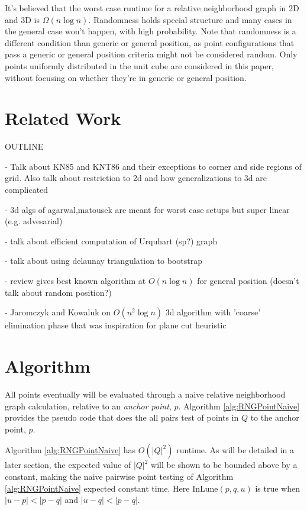 \documentclass[a4paper,fleqn]{cas-dc}
\begin{document}
It's believed that the worst case runtime for a relative neighborhood graph in 2D and 3D is
$\Omega(n \log n)$.
Randomness holds special structure and many cases in the general case won't happen, with
high probability.
Note that randomness is a different condition than generic or general position, as point
configurations that pass a generic or general position criteria might not be considered
random.
Only points uniformly distributed in the unit cube are considered in this paper,
without focusing on whether they're in generic or general position.






\section{Related Work}

OUTLINE

- Talk about KN85 and KNT86 and their exceptions to corner and side regions of grid.
  Also talk about restriction to 2d and how generalizations to 3d are complicated

- 3d algs of agarwal,matousek are meant for worst case setups but super linear (e.g. advesarial)

- talk about efficient computation of Urquhart (sp?) graph

- talk about using delaunay triangulation to bootstrap

- review gives best known algorithm at $O(n \log n)$ for general position (doesn't talk about random position?)

- Jaromczyk and Kowaluk on $O(n^2 \log n)$ 3d algorithm with 'coarse' elimination phase that was inspiration
  for plane cut heuristic


\section{Algorithm}

All points eventually will be evaluated through a naive relative neighborhood graph
calculation, relative to an \emph{anchor point}, $p$.
Algorithm \ref{alg:RNGPointNaive} provides the pseudo code that does the all pairs
test of points in $Q$ to the anchor point, $p$.

Algorithm \ref{alg:RNGPointNaive} has $O(|Q|^2)$ runtime.
As will be detailed
in a later section, the expected value of $|Q|^2$ will be shown to be bounded above by a constant, making the naive
pairwise point testing of Algorithm \ref{alg:RNGPointNaive} expected constant time.
Here $\text{InLune}(p,q,u)$ is true when $|u-p| < |p-q|$ and $|u-q| < |p-q|$.
\end{document}
